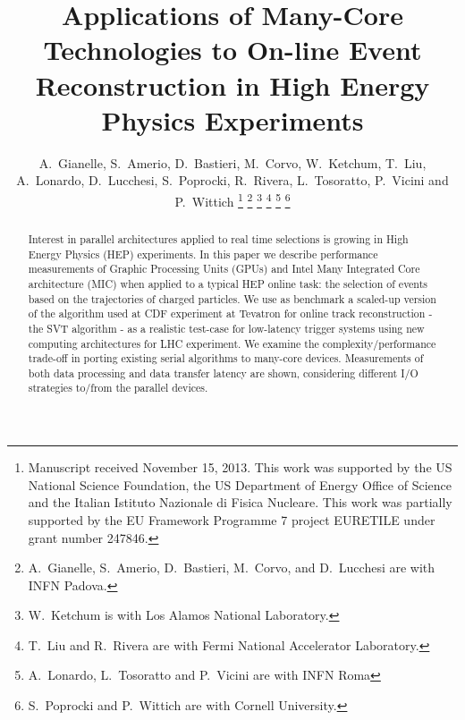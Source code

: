 \documentclass[journal]{IEEEtran}
\begin{document}
\title{Applications of Many-Core Technologies to On-line Event Reconstruction in High Energy Physics
Experiments}
\author{A.~Gianelle, 
  S.~Amerio, 
  D.~Bastieri, 
  M.~Corvo, 
  W.~Ketchum,
  T.~Liu, 
  A.~Lonardo, 
  D.~Lucchesi,
  S.~Poprocki, 
  R.~Rivera, 
  L.~Tosoratto,
  P.~Vicini
  and 
  P.~Wittich
\thanks{Manuscript received November 15, 2013.
This work was supported by the  US National Science Foundation, the US 
Department of Energy Office of Science and the Italian
Istituto Nazionale di Fisica Nucleare. This work was partially supported by the 
EU Framework Programme 7 project EURETILE under grant number 247846.}%
\thanks{A.~Gianelle, S.~Amerio, D.~Bastieri, M.~Corvo, and D.~Lucchesi are with INFN Padova.}%
\thanks{W.~Ketchum is with Los Alamos National Laboratory.}%
\thanks{T.~Liu and R.~Rivera are with Fermi National Accelerator Laboratory.}%
\thanks{A.~Lonardo, L.~Tosoratto and P.~Vicini are with INFN Roma}%
\thanks{S.~Poprocki and P.~Wittich are with Cornell University.}%
}
\maketitle
\thispagestyle{empty}
\begin{abstract}
  Interest in parallel architectures applied to real time selections is 
  growing in High Energy Physics (HEP) experiments. In this paper we describe
  performance measurements of Graphic Processing Units (GPUs) and Intel Many
  Integrated Core architecture (MIC) when applied to a typical HEP online task: 
  the selection of events based on the trajectories of charged particles.
  We use as benchmark a scaled-up version of the algorithm used at CDF 
  experiment at Tevatron for online track reconstruction - the SVT algorithm - 
  as a realistic  test-case for low-latency trigger systems using new computing
  architectures for LHC experiment. We examine the
  complexity/performance trade-off in porting existing serial
  algorithms to many-core devices. Measurements of both data processing 
  and data transfer latency are shown, considering different I/O strategies 
  to/from the parallel devices. \end{abstract}
\end{document}
